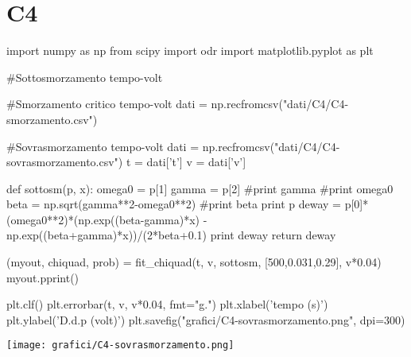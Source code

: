 \chapter{C4}

\begin{sagesilent}

import numpy as np
from scipy import odr
import matplotlib.pyplot as plt

#Sottosmorzamento tempo-volt

\end{sagesilent}



\begin{sagesilent}

#Smorzamento critico tempo-volt
dati = np.recfromcsv("dati/C4/C4-smorzamento.csv")



\end{sagesilent}


\begin{sagesilent}
#Sovrasmorzamento tempo-volt
dati = np.recfromcsv("dati/C4/C4-sovrasmorzamento.csv")
t = dati['t']
v = dati['v']

def sottosm(p, x):
  omega0 = p[1]
  gamma = p[2]
  #print gamma
  #print omega0
  beta = np.sqrt(gamma**2-omega0**2)
  #print beta
  print p
  deway = p[0]*(omega0**2)*(np.exp((beta-gamma)*x) - np.exp((beta+gamma)*x))/(2*beta+0.1)
  print deway
  return deway
  
(myout, chiquad, prob) = fit_chiquad(t, v, sottosm, [500,0.031,0.29], v*0.04)
myout.pprint()

plt.clf()
plt.errorbar(t, v, v*0.04, fmt="g.")
plt.xlabel('tempo (s)')
plt.ylabel('D.d.p (volt)')
plt.savefig("grafici/C4-sovrasmorzamento.png", dpi=300)
\end{sagesilent}

\begin{center}
\texttt{[image: grafici/C4-sovrasmorzamento.png]}
\end{center}

